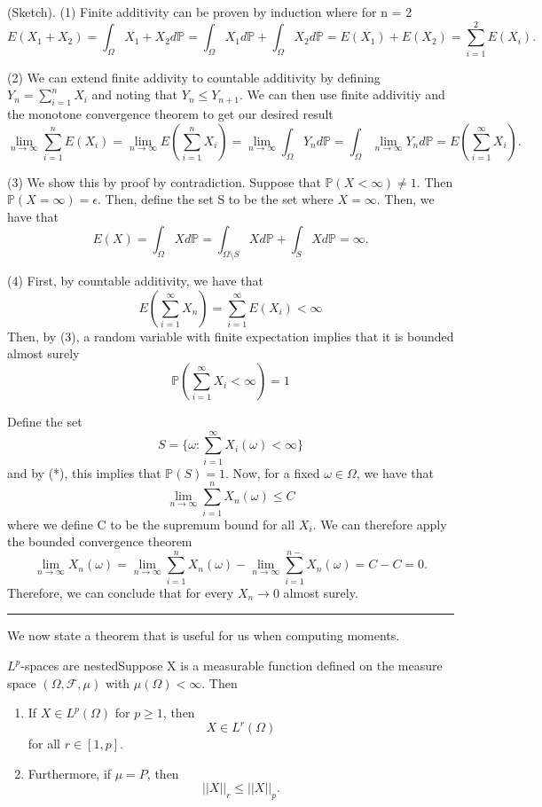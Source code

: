 \documentclass[twoside]{article}
\newenvironment{proof}{{\bf Proof:}}{\hfill\rule{2mm}{2mm}}
\newcommand{\prob}{\mathbb{P}}
\begin{document}
\begin{proof}(Sketch). (1) Finite additivity can be proven by induction where for n = 2
$$
E(X_1 + X_2) = \int_{\Omega}X_1 + X_2d\prob = \int_{\Omega}X_1d\prob + \int_{\Omega}X_2d\prob = E(X_1) + E(X_2) = \sum_{i=1}^{2}E(X_i).
$$

(2) We can extend finite addivity to countable additivity by defining $Y_n = \sum_{i=1}^{n}X_i$ and noting that $Y_n \leq Y_{n + 1}$. We can then use finite addivitiy and the monotone convergence theorem to get our desired result 
$$
\lim_{n \rightarrow \infty}\sum_{i=1}^{n}E(X_i) = \lim_{n \rightarrow \infty}E(\sum_{i=1}^{n}X_i) = \lim_{n \rightarrow \infty}\int_{\Omega}Y_nd\prob = \int_{\Omega}\lim_{n \rightarrow \infty}Y_nd\prob = E(\sum_{i=1}^{\infty}X_i).
$$

(3) We show this by proof by contradiction. Suppose that $\prob(X < \infty) \neq 1$. Then $\prob(X = \infty) = \epsilon.$ Then, define the set S to be the set where $X = \infty.$ Then, we have that
$$
E(X) = \int_{\Omega}Xd\prob = \int_{\Omega \setminus S}Xd\prob + \int_{S}Xd\prob = \infty.
$$

(4) First, by countable additivity, we have that 
$$
E(\sum_{i=1}^{\infty}X_n) = \sum_{i=1}^{\infty}E(X_i) < \infty
$$
Then, by (3), a random variable with finite expectation implies that it is bounded almost surely 
\begin{equation}
\prob( \sum_{i=1}^{\infty}X_i < \infty) = 1 
\tag{*}
\end{equation}

Define the set 
$$
S = \{\omega: \sum_{i=1}^{\infty}X_i(\omega) < \infty\}
$$
and by (*), this implies that $\prob(S) = 1.$ Now, for a fixed $\omega \in \Omega$, we have that 
$$
\lim_{n \rightarrow \infty}\sum_{i=1}^{n}X_n(\omega) \leq C
$$
where we define C to be the supremum bound for all $X_i.$ We can therefore apply the bounded convergence theorem 
$$
\lim_{n \rightarrow \infty}X_n(\omega) = \lim_{n \rightarrow \infty}\sum_{i=1}^{n}X_n(\omega) - \lim_{n \rightarrow \infty}\sum_{i=1}^{n - }X_n(\omega) = C - C = 0.
$$
Therefore, we can conclude that for every $X_n \rightarrow 0$ almost surely.
\end{proof}

We now state a theorem that is useful for us when computing moments.
\begin{theorem_exam}{$L^p$-spaces are nested}{}Suppose X is a measurable function defined on the measure space $(\Omega, \mathcal{F}, \mu)$ with $\mu(\Omega) < \infty$. Then 

\begin{enumerate}
\item If $X \in L^p(\Omega)$ for $p \geq 1$, then $$X \in L^r(\Omega)$$ for all $r \in [1, p].$ 
\item Furthermore, if $\mu = P$, then 
$$
||X||_r \leq ||X||_p.
$$
\end{enumerate}

\end{theorem_exam}
\end{document}
